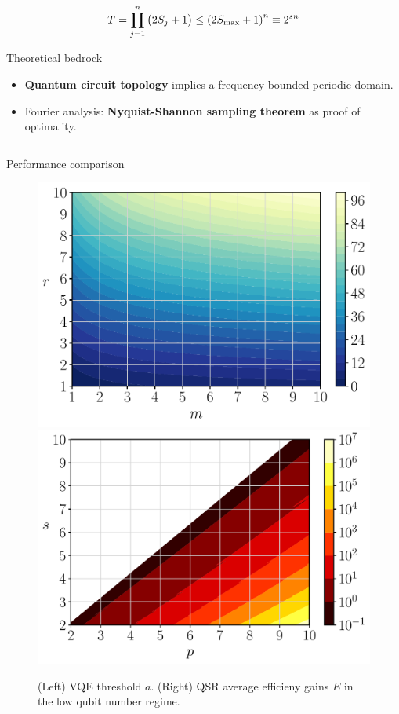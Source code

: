 \documentclass[final]{beamer}
\newlength{\onecolwid}
\newlength{\twocolwid}
\begin{document}
\begin{frame}[t]
\begin{columns}[t]
\begin{column}{\twocolwid}
\begin{columns}[t,totalwidth=\twocolwid]
\begin{column}{\onecolwid}
\begin{gather*} \label{eq:QSR-algorithm-samples}
  T = \prod_{j=1}^{n} \qty(2 S_{j} + 1) \leq
    \qty(2 S_\text{max} + 1)^{n} \equiv 2^{sn}
\end{gather*}

\begin{alertblock}{Theoretical bedrock}
  \begin{itemize}
    \item \textbf{Quantum circuit topology} implies a frequency-bounded periodic domain.
    \item Fourier analysis: \textbf{Nyquist-Shannon sampling theorem} as proof of optimality.
  \end{itemize}
\end{alertblock}


\end{column} %
\end{columns} %


\begin{alertblock}{Performance comparison}

  \begin{figure}
    \includegraphics[width=0.4\linewidth]{Figures/threshold.pdf}
    \includegraphics[width=0.4\linewidth]{Figures/efficiency.pdf}
    \caption{(Left) VQE threshold $a$. (Right) QSR average efficieny gains $E$ in the low qubit number regime.}
  \end{figure}


\end{alertblock}
\end{column}
\end{columns}
\end{frame}
\end{document}
